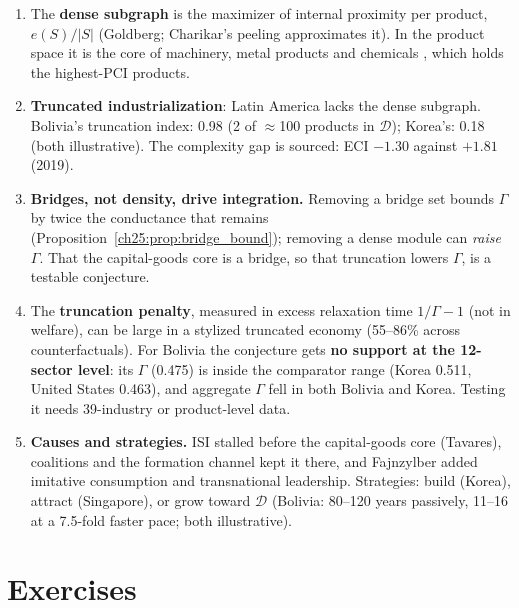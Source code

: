 \documentclass[../structural_economics_book.tex]{subfiles}
\begin{document}
\begin{enumerate}
\item The \textbf{dense subgraph} is the maximizer of internal proximity per product, $e(S)/|S|$ (Goldberg; Charikar's peeling approximates it). In the product space it is the core of machinery, metal products and chemicals \citep{hidalgo2007product}, which holds the highest-PCI products.

\item \textbf{Truncated industrialization}: Latin America lacks the dense subgraph. Bolivia's truncation index: 0.98 (2 of $\approx$100 products in $\mathcal{D}$); Korea's: 0.18 (both illustrative). The complexity gap is sourced: ECI $-1.30$ against $+1.81$ (2019).

\item \textbf{Bridges, not density, drive integration.} Removing a bridge set bounds $\Gamma$ by twice the conductance that remains (Proposition~\ref{ch25:prop:bridge_bound}); removing a dense module can \emph{raise} $\Gamma$. That the capital-goods core is a bridge, so that truncation lowers $\Gamma$, is a testable conjecture.

\item The \textbf{truncation penalty}, measured in excess relaxation time $1/\Gamma - 1$ (not in welfare), can be large in a stylized truncated economy (55--86\% across counterfactuals). For Bolivia the conjecture gets \textbf{no support at the 12-sector level}: its $\Gamma$ (0.475) is inside the comparator range (Korea 0.511, United States 0.463), and aggregate $\Gamma$ fell in both Bolivia and Korea. Testing it needs 39-industry or product-level data.

\item \textbf{Causes and strategies.} ISI stalled before the capital-goods core (Tavares), coalitions and the formation channel kept it there, and Fajnzylber added imitative consumption and transnational leadership. Strategies: build (Korea), attract (Singapore), or grow toward $\mathcal{D}$ (Bolivia: 80--120 years passively, 11--16 at a 7.5-fold faster pace; both illustrative).
\end{enumerate}


\section{Exercises}
\label{ch25:sec:exercises}
\end{document}
